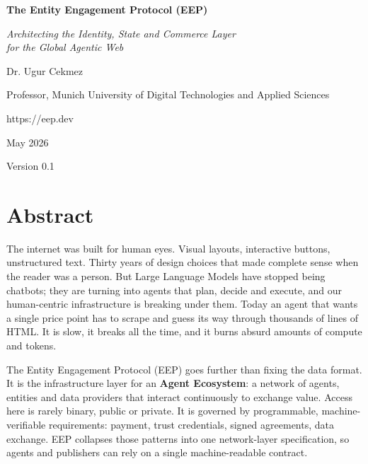 \documentclass[12pt,a4paper]{article}
\begin{document}
\begin{titlepage}
\centering
\vspace*{2cm}

{\Huge\bfseries The Entity Engagement Protocol (EEP)\par}
\vspace{1cm}
{\Large\itshape Architecting the Identity, State and Commerce Layer\\for the Global Agentic Web\par}
\vspace{4cm}

{\Large Dr. Ugur Cekmez\par}
{\small Professor, Munich University of Digital Technologies and Applied Sciences\par}
\vspace{0.5em}
\vspace{2.0cm}
{\large https://eep.dev\par}
\vspace{2.0cm}
{\large May 2026\par}

\vfill
{\small Version 0.1}
\end{titlepage}

\tableofcontents
\newpage

\section*{Abstract}

The internet was built for human eyes. Visual layouts, interactive buttons, unstructured text. Thirty years of design choices that made complete sense when the reader was a person. But Large Language Models have stopped being chatbots; they are turning into agents that plan, decide and execute, and our human-centric infrastructure is breaking under them. Today an agent that wants a single price point has to scrape and guess its way through thousands of lines of HTML. It is slow, it breaks all the time, and it burns absurd amounts of compute and tokens.

The Entity Engagement Protocol (EEP) goes further than fixing the data format. It is the infrastructure layer for an \textbf{Agent Ecosystem}: a network of agents, entities and data providers that interact continuously to exchange value. Access here is rarely binary, public or private. It is governed by programmable, machine-verifiable requirements: payment, trust credentials, signed agreements, data exchange. EEP collapses those patterns into one network-layer specification, so agents and publishers can rely on a single machine-readable contract.
\end{document}
